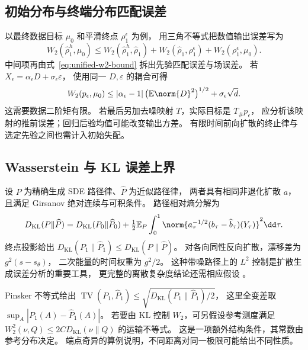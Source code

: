 \subsection{初始分布与终端分布匹配误差}

以最终数据目标 \(\mu_0\) 和平滑终点 \(\rho_1^\epsilon\) 为例，
用三角不等式把数值输出误差写为
\begin{equation}
 W_2(\widehat\rho_1^h,\mu_0)
 \le W_2(\widehat\rho_1^h,\widehat\rho_1)
     +W_2(\widehat\rho_1,\rho_1^\epsilon)
     +W_2(\rho_1^\epsilon,\mu_0).
 \label{eq:unified-error-budget}
\end{equation}
中间项再由式~\eqref{eq:unified-w2-bound} 拆出先验匹配误差与场误差。
若 \(X_\epsilon=\alpha_\epsilon D+\sigma_\epsilon\varepsilon\)，
使用同一 \(D,\varepsilon\) 的耦合可得
\[
 W_2(p_\epsilon,\mu_0)
 \le |\alpha_\epsilon-1|\,\bigl(\mathbb E\norm{D}^2\bigr)^{1/2}
                       +\sigma_\epsilon\sqrt d.
\]
这需要数据二阶矩有限。
若最后另加去噪映射 \(T\)，实际目标是 \(T_\#p_\epsilon\)，
应分析该映射的推前误差；回归后验均值可能改变输出方差。
有限时间前向扩散的终止律与选定先验之间也需计入初始失配。

\subsection{Wasserstein 与 KL 误差上界}

设 \(P\) 为精确生成 SDE 路径律、\(\widehat P\) 为近似路径律，
两者具有相同非退化扩散 \(a\)，且满足 Girsanov 绝对连续与可积条件。
路径相对熵分解为
\begin{equation}
 D_{\mathrm{KL}}(P\|\widehat P)
 =D_{\mathrm{KL}}(P_0\|\widehat P_0)
 +\tfrac12\mathbb E_P\int_0^1
       \norm{a_\tau^{-1/2}(b_\tau-\widehat b_\tau)(Y_\tau)}^2\dd\tau.
 \label{eq:unified-path-kl}
\end{equation}
终点投影给出 \(D_{\mathrm{KL}}(P_1\|\widehat P_1)
\le D_{\mathrm{KL}}(P\|\widehat P)\)。
对各向同性反向扩散，漂移差为 \(g^2(s-s_\theta)\)，
二次能量的时间权重为 \(g^2/2\)。
这种带噪路径上的 \(L^2\) 控制是扩散生成误差分析的重要工具，
更完整的离散复杂度结论还需相应假设 \cite{chen2023sampling}。

Pinsker 不等式给出 \(\operatorname{TV}(P_1,\widehat P_1)
\le\sqrt{D_{\mathrm{KL}}(P_1\|\widehat P_1)/2}\)，
这里全变差取 \(\sup_A|P_1(A)-\widehat P_1(A)|\)。
若要由 KL 控制 \(W_2\)，可另假设参考测度满足
\(W_2^2(\nu,Q)\le2C D_{\mathrm{KL}}(\nu\|Q)\) 的运输不等式。
这是一项额外结构条件，其常数由参考分布决定。
端点奇异的算例说明，不同距离对同一极限可能给出不同性质。

